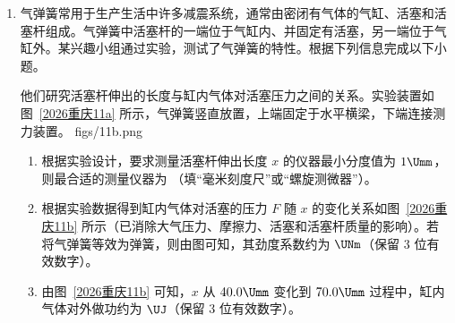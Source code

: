 \documentclass[\gkver]{gaokaozhenti}
\begin{document}
\begin{enumerate}
{匀强电场沿 $y$ 方向，电势差 $U_{MN}=E(y_{N}-y_{M})$

得 $U_{MN}=\frac{2v^{2}}{5k}$，故 B 正确；

C．曲线 $a$ 对应 $v^{2}=v_{0}^{2}+2kEy$

经过 $a$ 最右端时 $y=\frac{L}{2}$

整理可得 $v^{2}=v_{0}^{2}+kEL=v_{0}^{2}+\frac{v^{2}}{2}$

解得 $v_{0}=\frac{\sqrt{2}}{2}v$，故 C 错误；

D．由 $y=\frac{1}{2}kEt^{2}$ 得 $t=\sqrt{\frac{2y}{kE}}$

代入 $y_{M}=\frac{2v^{2}}{5a}$、$y_{N}=\frac{4v^{2}}{5a}$，可得 $\frac{t_{M}}{t_{N}}=\sqrt{\frac{y_{M}}{y_{N}}}=\sqrt{\frac{1}{2}}$，故 D 错误。

故选 AB。
}
\item
气弹簧常用于生产生活中许多减震系统，通常由密闭有气体的气缸、活塞和活塞杆组成。气弹簧中活塞杆的一端位于气缸内、并固定有活塞，另一端位于气缸外。某兴趣小组通过实验，测试了气弹簧的特性。根据下列信息完成以下小题。

他们研究活塞杆伸出的长度与缸内气体对活塞压力之间的关系。实验装置如图~\ref{2026重庆11a} 所示，气弹簧竖直放置，上端固定于水平横梁，下端连接测力装置。
{figs/11b.png}
\begin{enumerate}
	\item
	根据实验设计，要求测量活塞杆伸出长度 $x$ 的仪器最小分度值为 $1 \Umm$，则最合适的测量仪器为 （填“毫米刻度尺”或“螺旋测微器”）。
	\item
	根据实验数据得到缸内气体对活塞的压力 $F$ 随 $x$ 的变化关系如图~\ref{2026重庆11b} 所示（已消除大气压力、摩擦力、活塞和活塞杆质量的影响）。若将气弹簧等效为弹簧，则由图可知，其劲度系数约为  $\UNm$（保留 3 位有效数字）。
	\item
	由图~\ref{2026重庆11b} 可知，$x$ 从 $40.0 \Umm$ 变化到 $70.0 \Umm$ 过程中，缸内气体对外做功约为  $\UJ$（保留 3 位有效数字）。
\end{enumerate}

\end{enumerate}
\end{document}
